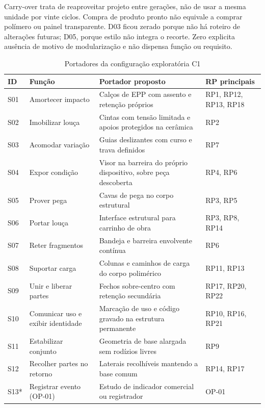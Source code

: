 Carry-over trata de reaproveitar projeto entre gerações, não de usar a mesma unidade por vinte ciclos. Compra de produto pronto não equivale a comprar polímero ou painel transparente. D03 ficou zerado porque não há roteiro de alterações futuras; D05, porque estilo não integra o recorte. Zero explicita ausência de motivo de modularização e não dispensa função ou requisito.

\begin{table}[H]
\centering\scriptsize\caption{Portadores da configuração exploratória C1}\label{tab:mim-portadores}
\begin{tabularx}{\textwidth}{L{0.8cm}L{3.7cm}YL{2.5cm}}
\toprule\textbf{ID}&\textbf{Função}&\textbf{Portador proposto}&\textbf{RP principais}\\\midrule
S01 & Amortecer impacto & Calços de EPP com assento e retenção próprios & RP1, RP12, RP13, RP18 \\
S02 & Imobilizar louça & Cintas com tensão limitada e apoios protegidos na cerâmica & RP2 \\
S03 & Acomodar variação & Guias deslizantes com curso e trava definidos & RP7 \\
S04 & Expor condição & Visor na barreira do próprio dispositivo, sobre peça descoberta & RP4, RP6 \\
S05 & Prover pega & Cavas de pega no corpo estrutural & RP3, RP5 \\
S06 & Portar louça & Interface estrutural para carrinho de obra & RP3, RP8, RP14 \\
S07 & Reter fragmentos & Bandeja e barreira envolvente contínua & RP6 \\
S08 & Suportar carga & Colunas e caminhos de carga do corpo polimérico & RP11, RP13 \\
S09 & Unir e liberar partes & Fechos sobre-centro com retenção secundária & RP17, RP20, RP22 \\
S10 & Comunicar uso e exibir identidade & Marcação de uso e código gravado na estrutura permanente & RP10, RP16, RP21 \\
S11 & Estabilizar conjunto & Geometria de base alargada sem rodízios livres & RP9 \\
S12 & Recolher partes no retorno & Laterais recolhíveis mantendo a base comum & RP14, RP17 \\
S13* & Registrar evento (OP-01) & Estudo de indicador comercial ou registrador & OP-01 \\
\bottomrule\end{tabularx}
\end{table}

